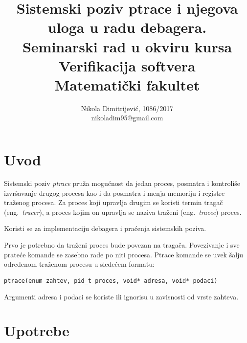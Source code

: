 \documentclass[a4paper]{article}
\begin{document}
\title{Sistemski poziv ptrace i njegova uloga u radu debagera.\\ \small{Seminarski rad u okviru kursa\\Verifikacija softvera\\ Matematički fakultet}}

\author{Nikola Dimitrijević, 1086/2017\\ nikoladim95@gmail.com}
\maketitle

    
\tableofcontents

\newpage
\section{Uvod}
\label{sec:uvod}
Sistemski poziv \emph{ptrace} pruža mogućnost da jedan proces,  posmatra
i kontroliše izvršavanje drugog procesa kao i da posmatra i menja
memoriju i registre traženog procesa. Za proces koji upravlja drugim se koristi termin tragač (eng.~{\em tracer}), a
proces kojim on upravlja se naziva traženi  (eng.~{\em tracee}) proces.

Koristi se za implementaciju debagera i praćenja sistemskih poziva.

Prvo je potrebno da traženi proces bude povezan na tragača. Povezivanje i sve prateće komande se
zasebno rade po niti procesa. Ptrace komande se uvek šalju određenom traženom procesu u sledećem formatu:

\begin{verbatim}
ptrace(enum zahtev, pid_t proces, void* adresa, void* podaci)
\end{verbatim}

Argumenti adresa i podaci se koriste ili ignorisu u zavisnosti od vrste zahteva.
\section{Upotrebe}
\end{document}
